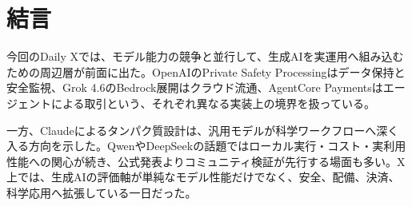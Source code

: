 \section{結言}
今回のDaily Xでは、モデル能力の競争と並行して、生成AIを実運用へ組み込むための周辺層が前面に出た。OpenAIのPrivate Safety Processingはデータ保持と安全監視、Grok 4.6のBedrock展開はクラウド流通、AgentCore Paymentsはエージェントによる取引という、それぞれ異なる実装上の境界を扱っている。

一方、Claudeによるタンパク質設計は、汎用モデルが科学ワークフローへ深く入る方向を示した。QwenやDeepSeekの話題ではローカル実行・コスト・実利用性能への関心が続き、公式発表よりコミュニティ検証が先行する場面も多い。X上では、生成AIの評価軸が単純なモデル性能だけでなく、安全、配備、決済、科学応用へ拡張している一日だった。
